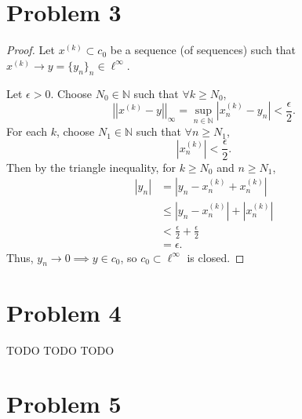 \documentclass{article}
\begin{document}
\section*{Problem 3}
\begin{proof}
	Let $x^{(k)}\subset c_0$ be a sequence (of sequences) such that \\ $x^{(k)}\rightarrow y=\{y_n\}_n \in \ell^{\infty}$. 
	
	Let $\epsilon > 0$. Choose $N_0 \in \mathbb{N}$ such that $\forall k \geq N_0$, 
	\begin{equation}
		\left|\left|x^{(k)} - y\right|\right|_{\infty} = \sup\limits_{n\in\mathbb{N}} \left|x_n^{(k)}-y_n\right| < \frac{\epsilon}{2}.
	\end{equation}
	For each $k$, choose $N_1\in\mathbb{N}$ such that $\forall n \geq N_1$, 
	\begin{equation}
		\left|x_n^{(k)}\right| < \frac{\epsilon}{2}.
	\end{equation}
	Then by the triangle inequality, for $k\geq N_0$ and $n\geq N_1$, 
	\begin{align}
		|y_n| &= \left|y_n - x_n^{(k)} + x_n^{(k)}\right| \\
		& \leq \left|y_n - x_n^{(k)}\right| + \left|x_n^{(k)}\right| \\
		&< \frac{\epsilon}{2} + \frac{\epsilon}{2} \\
		&= \epsilon.
	\end{align}
	Thus, $y_n \rightarrow 0 \implies y \in c_0$, so $c_0 \subset \ell^{\infty}$ is closed.
\end{proof}

\section*{Problem 4}
TODO TODO TODO 
\section*{Problem 5}
\end{document}
